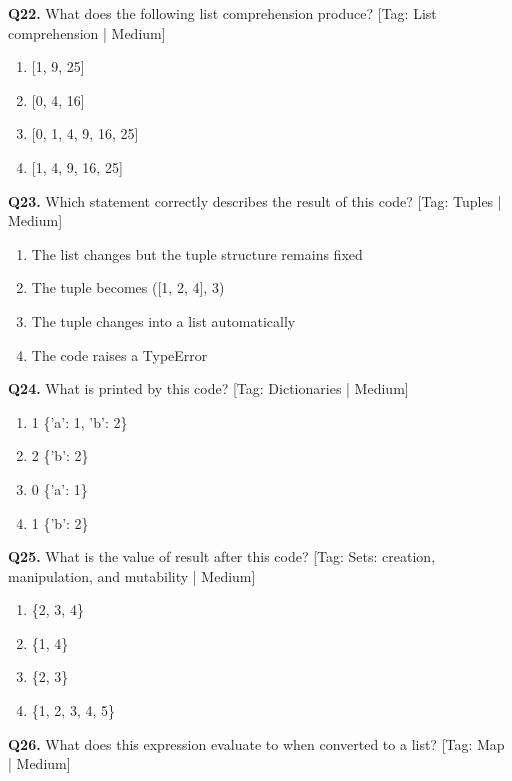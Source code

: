 \noindent\textbf{Q22.} What does the following list comprehension produce? \hfill [Tag: List comprehension | Medium]
\begin{enumerate}[label=(\alph*),topsep=2pt,itemsep=1pt,partopsep=0pt,parsep=0pt]
    \item {[1, 9, 25]}
    \item {[0, 4, 16]}
    \item {[0, 1, 4, 9, 16, 25]}
    \item {[1, 4, 9, 16, 25]}
\end{enumerate}
\vspace{2mm}
\noindent\textbf{Q23.} Which statement correctly describes the result of this code? \hfill [Tag: Tuples | Medium]
\begin{enumerate}[label=(\alph*),topsep=2pt,itemsep=1pt,partopsep=0pt,parsep=0pt]
    \item {The list changes but the tuple structure remains fixed}
    \item {The tuple becomes ([1, 2, 4], 3)}
    \item {The tuple changes into a list automatically}
    \item {The code raises a TypeError}
\end{enumerate}
\vspace{2mm}
\noindent\textbf{Q24.} What is printed by this code? \hfill [Tag: Dictionaries | Medium]
\begin{enumerate}[label=(\alph*),topsep=2pt,itemsep=1pt,partopsep=0pt,parsep=0pt]
    \item {1 \{'a': 1, 'b': 2\}}
    \item {2 \{'b': 2\}}
    \item {0 \{'a': 1\}}
    \item {1 \{'b': 2\}}
\end{enumerate}
\vspace{2mm}
\noindent\textbf{Q25.} What is the value of result after this code? \hfill [Tag: Sets: creation, manipulation, and mutability | Medium]
\begin{enumerate}[label=(\alph*),topsep=2pt,itemsep=1pt,partopsep=0pt,parsep=0pt]
    \item {\{2, 3, 4\}}
    \item {\{1, 4\}}
    \item {\{2, 3\}}
    \item {\{1, 2, 3, 4, 5\}}
\end{enumerate}
\vspace{2mm}
\noindent\textbf{Q26.} What does this expression evaluate to when converted to a list? \hfill [Tag: Map | Medium]
